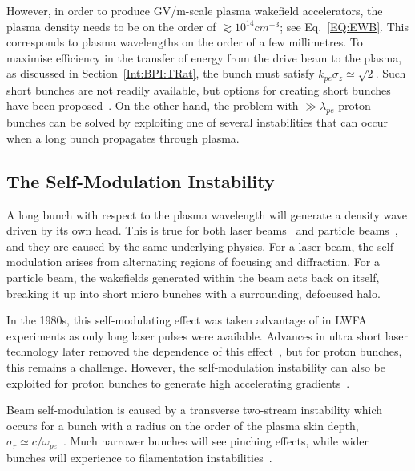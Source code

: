 However, in order to produce GV/m-scale plasma wakefield accelerators, the plasma density needs to be on the order of $\gtrsim 10^{14}\unit{cm}^{-3}$; see Eq.~\ref{EQ:EWB}. This corresponds to plasma wavelengths on the order of a few millimetres. To maximise efficiency in the transfer of energy from the drive beam to the plasma, as discussed in Section~\ref{Int:BPI:TRat}, the bunch must satisfy $k_{pe}\sigma_{z} \simeq \sqrt{2}$. Such short bunches are not readily available, but options for creating short bunches have been proposed~\cite{assmann:2009}. On the other hand, the problem with $\gg\lambda_{pe}$ proton bunches can be solved by exploiting one of several instabilities that can occur when a long bunch propagates through plasma.

\subsection{The Self-Modulation Instability}
\label{Int:DBeam:SMI}

A long bunch with respect to the plasma wavelength will generate a density wave driven by its own head. This is true for both laser beams~\cite{esarey:1994} and particle beams~\cite{kumar:2010}, and they are caused by the same underlying physics. For a laser beam, the self-modulation arises from alternating regions of focusing and diffraction. For a particle beam, the wakefields generated within the beam acts back on itself, breaking it up into short micro bunches with a surrounding, defocused halo.

In the 1980s, this self-modulating effect was taken advantage of in LWFA experiments as only long laser pulses were available. Advances in ultra short laser technology later removed the dependence of this effect~\cite{pukhov:2002}, but for proton bunches, this remains a challenge. However, the self-modulation instability can also be exploited for proton bunches to generate high accelerating gradients~\cite{schroeder:2012,schroeder:2011,caldwell:2009}.

Beam self-modulation is caused by a transverse two-stream instability which occurs for a bunch with a radius on the order of the plasma skin depth, $\sigma_{r} \simeq c/\omega_{pe}$~\cite{vieira:2012}. Much narrower bunches will see pinching effects, while wider bunches will experience to filamentation instabilities~\cite{keinigs:1987}.

